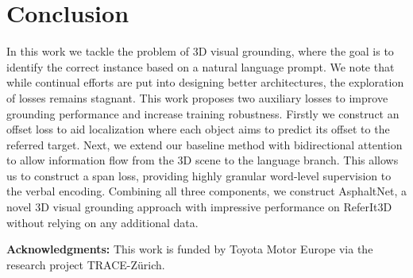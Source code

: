 \documentclass[10pt,twocolumn,letterpaper]{article}
\def\confName{WACV}
\def\confYear{2025}
\begin{document}
\section{Conclusion}

In this work we tackle the problem of 3D visual grounding, where the goal is to identify the correct instance based on a natural language prompt. We note that while continual efforts are put into designing better architectures, the exploration of losses remains stagnant.  This work proposes two auxiliary losses to improve grounding performance and increase training robustness. Firstly we construct an offset loss to aid localization where each object aims to predict its offset to the referred target. Next, we extend our baseline method with bidirectional attention to allow information flow from the 3D scene to the language branch. This allows us to construct a span loss, providing highly granular word-level supervision to the verbal encoding. Combining all three components, we construct AsphaltNet, a novel 3D visual grounding approach with impressive performance on ReferIt3D without relying on any additional data.

\noindent\textbf{Acknowledgments:} This work is funded by Toyota Motor Europe via the research project TRACE-Z\"urich.





\end{document}
